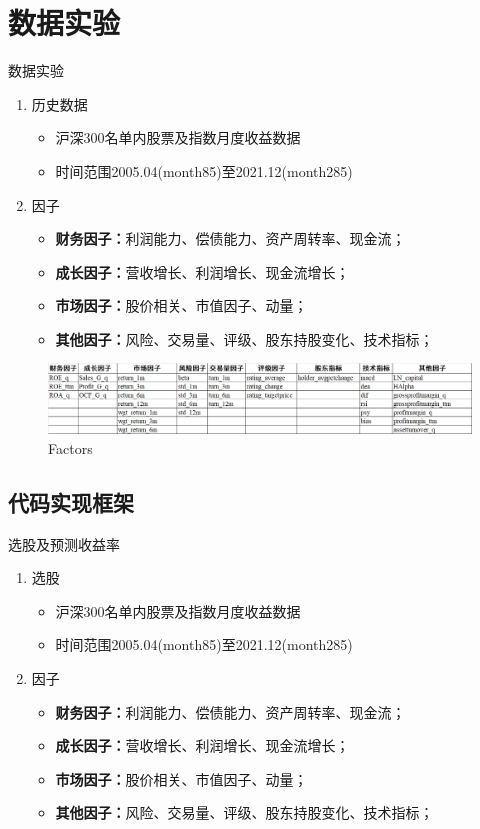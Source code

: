 \documentclass[CJK,aspectratio=169]{beamer}  %
\begin{document}
\section{数据实验}
\begin{frame}{数据实验}
	\begin{enumerate}
		\item 历史数据
		\begin{itemize}
			\item 沪深300名单内股票及指数月度收益数据
			\item 时间范围2005.04(month85)至2021.12(month285)
		\end{itemize}
		\item 因子
		\begin{itemize}
			\item \textbf{财务因子：}利润能力、偿债能力、资产周转率、现金流；
			\item \textbf{成长因子：}营收增长、利润增长、现金流增长；
			\item \textbf{市场因子：}股价相关、市值因子、动量；
			\item \textbf{其他因子：}风险、交易量、评级、股东持股变化、技术指标；
		\end{itemize}
	\end{enumerate}
	\begin{figure}
		\centering
		\includegraphics[width=1\linewidth]{pic/factors}
		\caption{Factors}
		\label{fig:factors}
	\end{figure}
\end{frame}

\subsection{代码实现框架}
\begin{frame}{选股及预测收益率}
	\begin{enumerate}
	\item 选股
	\begin{itemize}
		\item 沪深300名单内股票及指数月度收益数据
		\item 时间范围2005.04(month85)至2021.12(month285)
	\end{itemize}
	\item 因子
	\begin{itemize}
		\item \textbf{财务因子：}利润能力、偿债能力、资产周转率、现金流；
		\item \textbf{成长因子：}营收增长、利润增长、现金流增长；
		\item \textbf{市场因子：}股价相关、市值因子、动量；
		\item \textbf{其他因子：}风险、交易量、评级、股东持股变化、技术指标；
	\end{itemize}
\end{enumerate}
\end{frame}
\end{document}
